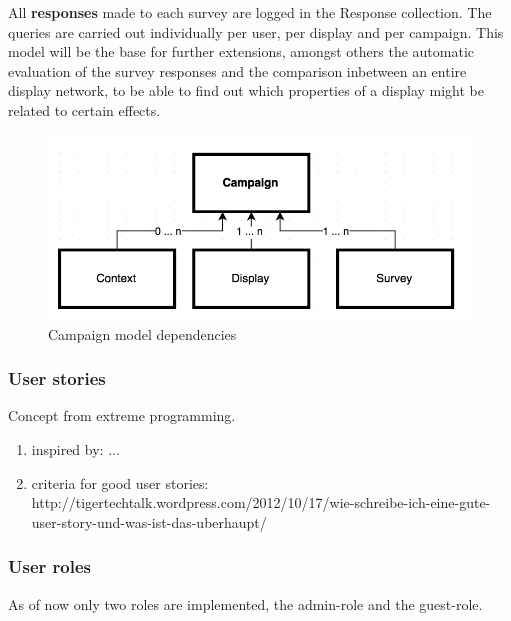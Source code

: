 All \textbf{responses} made to each survey are logged in the Response collection. The queries are carried out individually per user, per display and per campaign. This model will be the base for further extensions, amongst others the automatic evaluation of the survey responses and the comparison inbetween an entire display network, to be able to find out which properties of a display might be related to certain effects.

\begin{figure}%
    \begin{center}
        \includegraphics[width=.8\columnwidth]{img/4_implementation/4-dependency-campaign}
    \end{center}
 \caption{Campaign model dependencies}
 \label{fig:4-dependency-campaign}
\end{figure}



\subsubsection{User stories}

Concept from extreme programming.

\begin{enumerate}
\item inspired by: ...
\item criteria for good user stories: http://tigertechtalk.wordpress.com/2012/10/17/wie-schreibe-ich-eine-gute-user-story-und-was-ist-das-uberhaupt/
\end{enumerate}





\subsubsection{User roles}

As of now only two roles are implemented, the admin-role and the guest-role.

